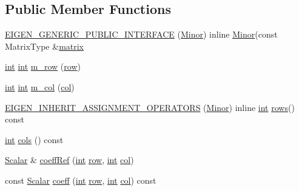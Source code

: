 \subsection*{Public Member Functions}
\begin{DoxyCompactItemize}
\item 
\hyperlink{class_minor_ab21a845d197458d259ca228684aaec6d}{E\-I\-G\-E\-N\-\_\-\-G\-E\-N\-E\-R\-I\-C\-\_\-\-P\-U\-B\-L\-I\-C\-\_\-\-I\-N\-T\-E\-R\-F\-A\-C\-E} (\hyperlink{class_minor}{Minor}) inline \hyperlink{class_minor}{Minor}(const Matrix\-Type \&\hyperlink{glext_8h_a7b24a3f2f56eb1244ae69dacb4fecb6f}{matrix}
\item 
\hyperlink{ioapi_8h_a787fa3cf048117ba7123753c1e74fcd6}{int} \hyperlink{ioapi_8h_a787fa3cf048117ba7123753c1e74fcd6}{int} \hyperlink{class_minor_a40240914a399d8cb481c7d50a16aff4a}{m\-\_\-row} (\hyperlink{glext_8h_a11b277b422822f784ee248b43eee3e1e}{row})
\item 
\hyperlink{ioapi_8h_a787fa3cf048117ba7123753c1e74fcd6}{int} \hyperlink{ioapi_8h_a787fa3cf048117ba7123753c1e74fcd6}{int} \hyperlink{class_minor_ac4b3ae2cdb4ba65370578094d7a98ba6}{m\-\_\-col} (\hyperlink{class_minor_abbdcf722ac69ca909b979719d920a0c3}{col})
\item 
\hyperlink{class_minor_a74fcb1449a2d2dc1b81234833ec189ed}{E\-I\-G\-E\-N\-\_\-\-I\-N\-H\-E\-R\-I\-T\-\_\-\-A\-S\-S\-I\-G\-N\-M\-E\-N\-T\-\_\-\-O\-P\-E\-R\-A\-T\-O\-R\-S} (\hyperlink{class_minor}{Minor}) inline \hyperlink{ioapi_8h_a787fa3cf048117ba7123753c1e74fcd6}{int} \hyperlink{class_matrix_base_ae82810ba95da637cdf434b4274083723}{rows}() const 
\item 
\hyperlink{ioapi_8h_a787fa3cf048117ba7123753c1e74fcd6}{int} \hyperlink{class_minor_a0ac61cb2861011a476403b83d4fed359}{cols} () const 
\item 
\hyperlink{class_matrix_base_a625df8339dc2d816cbc0fd66e7dadaf5}{Scalar} \& \hyperlink{class_minor_a2972155fb0a7aa1dbaa773bd22171a3b}{coeff\-Ref} (\hyperlink{ioapi_8h_a787fa3cf048117ba7123753c1e74fcd6}{int} \hyperlink{glext_8h_a11b277b422822f784ee248b43eee3e1e}{row}, \hyperlink{ioapi_8h_a787fa3cf048117ba7123753c1e74fcd6}{int} \hyperlink{class_minor_abbdcf722ac69ca909b979719d920a0c3}{col})
\item 
const \hyperlink{class_matrix_base_a625df8339dc2d816cbc0fd66e7dadaf5}{Scalar} \hyperlink{class_minor_ab94a445c6928f643ae09abc702bd98a2}{coeff} (\hyperlink{ioapi_8h_a787fa3cf048117ba7123753c1e74fcd6}{int} \hyperlink{glext_8h_a11b277b422822f784ee248b43eee3e1e}{row}, \hyperlink{ioapi_8h_a787fa3cf048117ba7123753c1e74fcd6}{int} \hyperlink{class_minor_abbdcf722ac69ca909b979719d920a0c3}{col}) const 
\end{DoxyCompactItemize}
